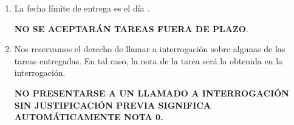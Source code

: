 \begin{enumerate}[(1)]
  \item

    La fecha límite de entrega es el día \tcm{\deadline}.

    \begin{center}
        \Large{
          \textbf{NO SE ACEPTARÁN TAREAS FUERA DE PLAZO}.
        }
        \normalsize
    \end{center}
     
    
  \item
    Nos reservamos el derecho de llamar a interrogación
    sobre algunas de las tareas entregadas.
    En tal caso,
    la nota de la tarea será la obtenida en la interrogación.
    \begin{center}
      \Large{
        \textbf{NO PRESENTARSE A UN LLAMADO A INTERROGACIÓN SIN JUSTIFICACIÓN PREVIA SIGNIFICA AUTOMÁTICAMENTE NOTA 0.}
      }
    \end{center}
    
  \end{enumerate}
